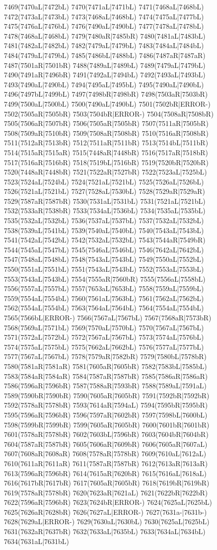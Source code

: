 7469(7470aL|7472bL) 7470(7471aL|7471bL) 7471(7468aL|7468bL) 7472(7473aL|7473bL) 7473(7468aL|7468bL) 7474(7475aL|7477bL) 7475(7476aL|7476bL) 7476(7490aL|7490bL) 7477(7478aL|7478bL) 7478(7468aL|7468bL) 7479(7480aR|7485bR) 7480(7481aL|7483bL) 7481(7482aL|7482bL) 7482(7479aL|7479bL) 7483(7484aL|7484bL) 7484(7479aL|7479bL) 7485(7486bL|7488bL) 7486(7487aR|7487aR) 7487(7501aR|7501bR) 7488(7489aL|7489bL) 7489(7479aL|7479bL) 7490(7491aR|7496bR) 7491(7492aL|7494bL) 7492(7493aL|7493bL) 7493(7490aL|7490bL) 7494(7495aL|7495bL) 7495(7490aL|7490bL) 7496(7497bL|7499bL) 7497(7498bR|7498bR) 7498(7503aR|7503bR) 7499(7500aL|7500bL) 7500(7490aL|7490bL) 7501(7502bR|ERROR-) 7502(7505aR|7505bR) 7503(7504bR|ERROR-) 7504(7508aR|7508bR) 7505(7506aR|7507bR) 7506(7505aR|7505bR) 7507(7511aR|7505bR) 7508(7509aR|7510bR) 7509(7508aR|7508bR) 7510(7516aR|7508bR) 7511(7512aR|7513bR) 7512(7511aR|7511bR) 7513(7514bL|7511bR) 7514(7515aR|7515aR) 7515(7448aR|7448bR) 7516(7517aR|7518bR) 7517(7516aR|7516bR) 7518(7519bL|7516bR) 7519(7520bR|7520bR) 7520(7448aR|7448bR) 7521(7522aR|7527bR) 7522(7523aL|7525bL) 7523(7524aL|7524bL) 7524(7521aL|7521bL) 7525(7526aL|7526bL) 7526(7521aL|7521bL) 7527(7528aL|7530bL) 7528(7529aR|7529aR) 7529(7587aR|7587bR) 7530(7531aL|7531bL) 7531(7521aL|7521bL) 7532(7533aR|7538bR) 7533(7534aL|7536bL) 7534(7535aL|7535bL) 7535(7532aL|7532bL) 7536(7537aL|7537bL) 7537(7532aL|7532bL) 7538(7539aL|7541bL) 7539(7540aL|7540bL) 7540(7543aL|7543bL) 7541(7542aL|7542bL) 7542(7532aL|7532bL) 7543(7544aR|7549bR) 7544(7545aL|7547bL) 7545(7546aL|7546bL) 7546(7642aL|7642bL) 7547(7548aL|7548bL) 7548(7543aL|7543bL) 7549(7550aL|7552bL) 7550(7551aL|7551bL) 7551(7543aL|7543bL) 7552(7553aL|7553bL) 7553(7543aL|7543bL) 7554(7555aR|7560bR) 7555(7556aL|7558bL) 7556(7557aL|7557bL) 7557(7653aL|7653bL) 7558(7559aL|7559bL) 7559(7554aL|7554bL) 7560(7561aL|7563bL) 7561(7562aL|7562bL) 7562(7554aL|7554bL) 7563(7564aL|7564bL) 7564(7554aL|7554bL) 7565(7566bL|ERROR-) 7566(7567aL|7567bL) 7567(7568aR|7573bR) 7568(7569aL|7571bL) 7569(7570aL|7570bL) 7570(7567aL|7567bL) 7571(7572aL|7572bL) 7572(7567aL|7567bL) 7573(7574aL|7576bL) 7574(7575aL|7575bL) 7575(7662aL|7662bL) 7576(7577aL|7577bL) 7577(7567aL|7567bL) 7578(7579aR|7582bR) 7579(7580bL|7578bR) 7580(7581aR|7581aR) 7581(7605aR|7605bR) 7582(7583bL|7585bL) 7583(7584aR|7584aR) 7584(7587aR|7587bR) 7585(7586aR|7586aR) 7586(7596aR|7596bR) 7587(7588aR|7593bR) 7588(7589aL|7591aL) 7589(7590bR|7590bR) 7590(7605aR|7605bR) 7591(7592bR|7592bR) 7592(7578aR|7578bR) 7593(7614aR|7594aL) 7594(7595bR|7595bR) 7595(7596aR|7596bR) 7596(7597aR|7602bR) 7597(7598bL|7600bL) 7598(7599bR|7599bR) 7599(7605aR|7605bR) 7600(7601bR|7601bR) 7601(7578aR|7578bR) 7602(7603bL|7596bR) 7603(7604bR|7604bR) 7604(7587aR|7587bR) 7605(7606aR|7609bR) 7606(7605aR|7607aL) 7607(7608aR|7608aR) 7608(7578aR|7578bR) 7609(7610aL|7612aL) 7610(7611aR|7611aR) 7611(7587aR|7587bR) 7612(7613aR|7613aR) 7613(7596aR|7596bR) 7614(7615aR|7620bR) 7615(7616aL|7618aL) 7616(7617bR|7617bR) 7617(7605aR|7605bR) 7618(7619bR|7619bR) 7619(7578aR|7578bR) 7620(7623aR|7621aL) 7621(7622bR|7622bR) 7622(7596aR|7596bR) 7623(7624bR|ERROR-) 7624(7625aL|7625bL) 7625(7626aR|7628bR) 7626(7627aL|ERROR-) 7627(7631a-|7631b-) 7628(7629aL|ERROR-) 7629(7630aL|7630bL) 7630(7625aL|7625bL) 7631(7632aR|7637bR) 7632(7633aL|7635bL) 7633(7634aL|7634bL) 7634(7631aL|7631bL) 